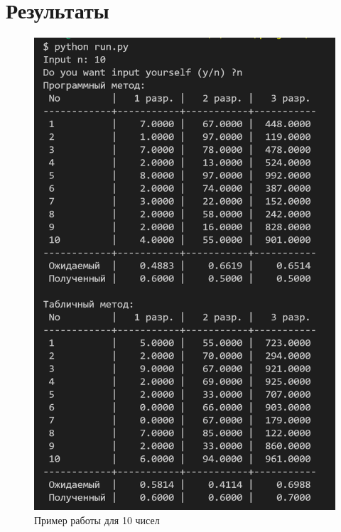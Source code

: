 \documentclass[a4paper, 12pt]{article}
\begin{document}
\section{{Результаты}}
\begin{figure}[h!]
	\centering \includegraphics[scale=1]{10}
	\centering\caption{Пример работы для 10 чисел}
\end{figure}
\clearpage
\newpage
\end{document}
